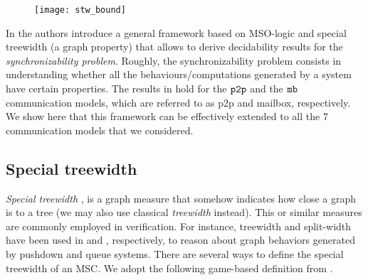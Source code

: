 
\begin{figure}[ht]
	\begin{center}
	\texttt{[image: stw\_bound]}
	\end{center}
\end{figure}

In \cite{BolligFG21} the authors introduce a general framework based on MSO-logic and special treewidth (a graph property) that allows to derive decidability results for the \emph{synchronizability problem}. Roughly, the synchronizability problem consists in understanding whether all the behaviours/computations generated by a system have certain properties. The results in \cite{BolligFG21} hold for the $\mathtt{p2p}$ and the $\mathtt{mb}$ communication models, which are referred to as p2p and mailbox, respectively. We show here that this framework can be effectively extended to all the 7 communication models that we considered.

\subsection{Special treewidth}

\emph{Special treewidth} \cite{Courcelle10},
is a graph measure that somehow indicates how close
a graph is to a tree (we may also use classical \emph{treewidth} instead).
This or similar measures are commonly employed in verification. For instance, treewidth and split-width have been used in \cite{MadhusudanP11} and \cite{DBLP:conf/concur/CyriacGK12,AiswaryaGK14}, respectively, to reason about graph behaviors generated by pushdown and queue systems.
There are several ways to define the special treewidth of an MSC.
We adopt the following game-based definition from \cite{DBLP:journals/corr/abs-1904-06942}.

